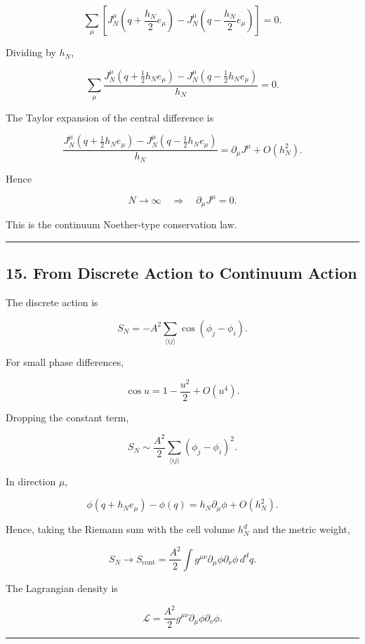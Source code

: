 \documentclass[
  a4paper,
]{article}
\begin{document}
\[
\sum_\mu
\left[
J_N^\mu
\left(
q+\frac{h_N}{2}e_\mu
\right)
-
J_N^\mu
\left(
q-\frac{h_N}{2}e_\mu
\right)
\right]
=0.
\tag{49}
\]

Dividing by \(h_N\),

\[
\boxed{
\sum_\mu
\frac{
J_N^\mu(q+\tfrac12h_Ne_\mu)
-
J_N^\mu(q-\tfrac12h_Ne_\mu)
}{
h_N
}
=
0.
}
\tag{50}
\]

The Taylor expansion of the central difference is

\[
\frac{
J_N^\mu(q+\tfrac12h_Ne_\mu)
-
J_N^\mu(q-\tfrac12h_Ne_\mu)
}{
h_N
}
=
\partial_\mu J^\mu
+
O(h_N^2).
\tag{51}
\]

Hence

\[
\boxed{
N\to\infty
\quad\Longrightarrow\quad
\partial_\mu J^\mu=0.
}
\tag{52}
\]

This is the continuum Noether-type conservation law.

\begin{center}\rule{0.5\linewidth}{0.5pt}\end{center}

\subsection{15. From Discrete Action to Continuum
Action}\label{from-discrete-action-to-continuum-action}

The discrete action is

\[
S_N
=
-A^2
\sum_{\langle ij\rangle}
\cos(\phi_j-\phi_i).
\]

For small phase differences,

\[
\cos u
=
1-\frac{u^2}{2}
+
O(u^4).
\tag{53}
\]

Dropping the constant term,

\[
S_N
\sim
\frac{A^2}{2}
\sum_{\langle ij\rangle}
(\phi_j-\phi_i)^2.
\tag{54}
\]

In direction \(\mu\),

\[
\phi(q+h_Ne_\mu)-\phi(q)
=
h_N\partial_\mu\phi
+
O(h_N^2).
\]

Hence, taking the Riemann sum with the cell volume \(h_N^d\) and the
metric weight,

\[
\boxed{
S_N
\longrightarrow
S_{\mathrm{cont}}
=
\frac{A^2}{2}
\int
g^{\mu\nu}
\partial_\mu\phi
\partial_\nu\phi
\,d^dq.
}
\tag{55}
\]

The Lagrangian density is

\[
\boxed{
\mathcal L
=
\frac{A^2}{2}
g^{\mu\nu}
\partial_\mu\phi
\partial_\nu\phi.
}
\tag{56}
\]

\begin{center}\rule{0.5\linewidth}{0.5pt}\end{center}
\end{document}
